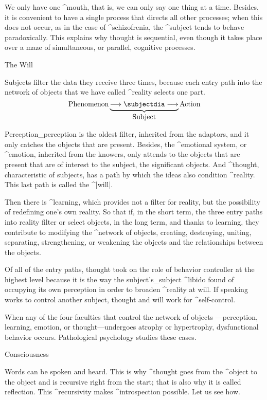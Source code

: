 We only have one ^{mouth}, that is, we can only say one thing at a time.
Besides, it is convenient to have a single process that directs all
other processes; when this does not occur, as in the case of
^{schizofrenia}, the ^{subject} tends to behave paradoxically. This
explains why thought is sequential, even though it takes place over a
maze of simultaneous, or parallel, cognitive processes.


\Section The Will

Subjects filter the data they receive three times, because each entry
path into the network of objects that we have called ^{reality} selects
one part.
$$\hbox{Phenomenon}
  \underbrace{\longrightarrow\subjectdia
   \longrightarrow}_{\hbox{Subject}}
  \hbox{Action}
\abovedisplayskip=\abovedisplayshortskip
\belowdisplayskip=\belowdisplayshortskip
$$

Perception_{perception} is the oldest filter, inherited from the
adaptors, and it only catches the objects that are present. Besides, the
^{emotional system}, or ^{emotion}, inherited from the knowers, only
attends to the objects that are present that are of interest to the
subject, the significant objects. And ^{thought}, characteristic of
subjects, has a path by which the ideas also condition ^{reality}. This
last path is called the ^|will|.

Then there is ^{learning}, which provides not a filter for reality, but
the possibility of redefining one's own reality. So that if, in the
short term, the three entry paths into reality filter or select objects,
in the long term, and thanks to learning, they contribute to \hbox{modifying} %
the ^{network of objects}, creating, destroying, uniting, separating,
strengthening, or weakening the objects and the relationships between
the objects.

Of all of the entry paths, thought took on the role of behavior
controller at the highest level because it is the way the
subject's_{subject} ^{libido} found of occupying its own perception in
order to broaden ^{reality} at will. If speaking works to control
another subject, thought and will work for ^{self-control}.

When any of the four faculties that control the network of objects
---perception, learning, emotion, or thought---undergoes atrophy or
hypertrophy, dysfunctional behavior occurs. Pathological psychology
studies these cases.


\Section Consciousness

Words can be spoken and heard. This is why ^{thought} goes from the
^{object} to the object and is recursive right from the start; that is
also why it is called reflection. This ^{recursivity} makes
^{introspection} possible. Let us see how.

